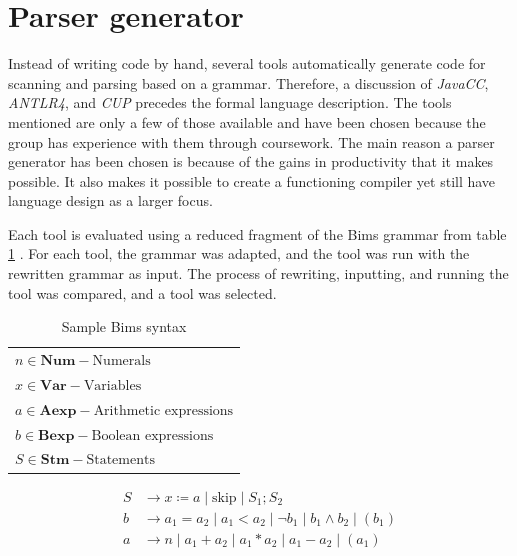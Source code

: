 \section{Parser generator}\label{sec:parsergenerator}
Instead of writing code by hand, several tools automatically generate code for scanning and parsing based on a grammar.  Therefore, a discussion of \textit{JavaCC}, \textit{ANTLR4}, and \textit{CUP} precedes the formal language description. The tools mentioned are only a few of those available and have been chosen because the group has experience with them through coursework.  The main reason a parser generator has been chosen is because of the gains in productivity that it makes possible. It also makes it possible to create a functioning compiler yet still have language design as a larger focus.  


Each tool is evaluated using a reduced fragment of the Bims grammar from table \ref{tab:bimsgrammar} \cite{Huttel2010}. For each tool, the grammar was adapted, and the tool was run with the rewritten grammar as input. The process of rewriting, inputting, and running the tool was compared, and a tool was selected.


\begin{table}[htb!]
    \centering
    \begin{tabular}{l}
    $n \in \textbf{Num} - \text{Numerals}$\\
    $x \in \textbf{Var} - \text{Variables}$\\
    $a \in \textbf{Aexp} - \text{Arithmetic expressions}$\\
    $b \in \textbf{Bexp} - \text{Boolean expressions}$\\
    $S \in \textbf{Stm} - \text{Statements}$\\
    \end{tabular}
    \begin{align*}
    S & \rightarrow  x \coloneqq a \mid \text{skip} \mid S_1;S_2\\
    b & \rightarrow a_1 = a_2 \mid a_1 < a_2 \mid \neg b_1 \mid b_1 \land b_2 \mid (b_1)\\
    a & \rightarrow n \mid a_1 + a_2 \mid a_1 * a_2 \mid a_1 - a_2 \mid (a_1)
    \end{align*}
    \caption{Sample Bims syntax \cite{Huttel2010}}
    \label{tab:bimsgrammar}
\end{table}


